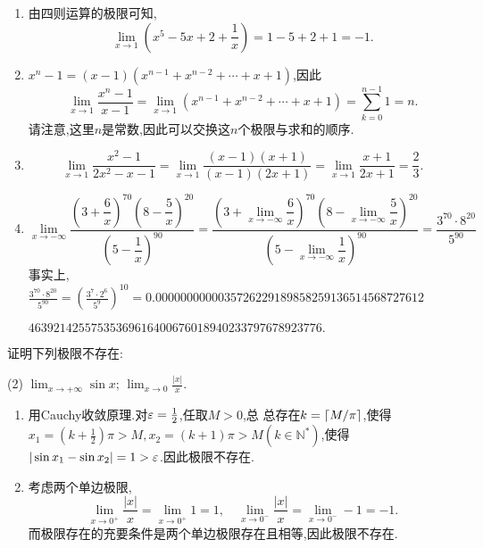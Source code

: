 \begin{enumerate}[(1)]
    \item 由四则运算的极限可知,$$\lim_{x \to 1} \left(x^5 - 5x + 2 + \frac{1}{x}\right) = 1 - 5 + 2 + 1 = -1.$$
    \item $x^n - 1 = (x-1)(x^{n-1} + x^{n-2} + \cdots + x + 1)$,因此$$\lim_{x \to 1} \frac{x^n - 1}{x - 1} = \lim_{x \to 1} (x^{n-1} + x^{n-2} + \cdots + x + 1) = \sum_{k=0}^{n-1} 1 = n.$$
          请注意,这里$n$是常数,因此可以交换这$n$个极限与求和的顺序.
    \item $$\lim_{x \to 1} \frac{x^2-1}{2x^2-x-1} = \lim_{x \to 1} \frac{(x-1)(x+1)}{(x-1)(2x+1)} = \lim_{x \to 1} \frac{x+1}{2x+1} = \frac{2}{3}.$$
    \item $$\lim_{x \to -\infty} \frac{ \left( 3 + \dfrac{6}{x} \right)^{70} (8 - \dfrac{5}{x})^{20} }{ \left( 5 - \dfrac{1}{x} \right)^{90} } = \frac{ \left( 3 + \displaystyle \lim_{x \to -\infty} \dfrac{6}{x} \right)^{70} \left( 8 - \displaystyle  \lim_{x \to -\infty} \dfrac{5}{x} \right)^{20} }{ \left( 5 - \displaystyle  \lim_{x \to -\infty} \dfrac{1}{x} \right)^{90} } = \frac{3^{70} \cdot 8^{20}}{5^{90}}$$
          事实上,$\frac{3^{70} \cdot 8^{20}}{5^{90}} = \left( \frac{3^7 \cdot 2^6}{5^9} \right)^{10} =0.0000000000035726229189858259136514568727612$

          $46392142557535369616400676018940233797678923776.$
\end{enumerate}

\begin{exercise}[1.3.3]\label{exe:1.3.3}
    证明下列极限不存在:
    \begin{tasks}[label=(\arabic*)](2)
        \task $\lim_{x \to +\infty} \sin x$;
        \task $\lim_{x \to 0} \frac{|x|}{x}$.
    \end{tasks}
\end{exercise}

\begin{enumerate}[(1)]
    \item 用Cauchy收敛原理.对$\ve = \frac{1}{2}$,任取$M > 0$,总
          总存在$k = \llceil M / \pi \rrceil$,使得$x_1 = \left(k+\frac{1}{2}\right)\pi> M, x_2 = (k + 1)\pi > M (k \in \mathbb{N}^*)$,使得$|\sin x_1 - \sin x_2| = 1 > \ve$.因此极限不存在.
    \item 考虑两个单边极限,$$\lim_{x \to 0^+} \frac{|x|}{x} = \lim_{x \to 0^+} 1 = 1, \quad \lim_{x \to 0^-} \frac{|x|}{x} = \lim_{x \to 0^-} -1 = -1.$$
          而极限存在的充要条件是两个单边极限存在且相等,因此极限不存在.
\end{enumerate}

